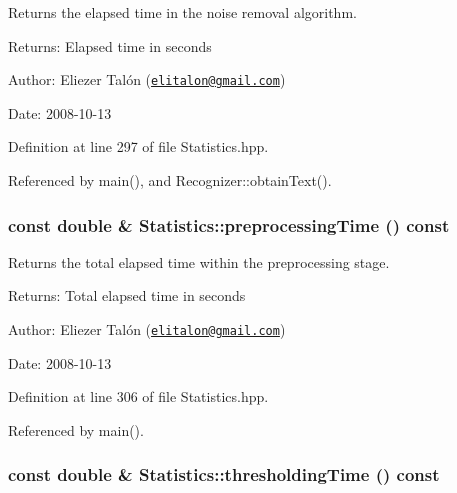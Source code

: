 Returns the elapsed time in the noise removal algorithm. 

\begin{Desc}
\item[Returns:]Elapsed time in seconds\end{Desc}
\begin{Desc}
\item[Author:]Eliezer Talón (\href{mailto:elitalon@gmail.com}{\tt elitalon@gmail.com}) \end{Desc}
\begin{Desc}
\item[Date:]2008-10-13 \end{Desc}


Definition at line 297 of file Statistics.hpp.

Referenced by main(), and Recognizer::obtainText().\hypertarget{class_statistics_9b1c2d1f1338069346c80293a2c11b6d}{
\subsubsection[preprocessingTime]{\setlength{\rightskip}{0pt plus 5cm}const double \& Statistics::preprocessingTime () const}}
\label{class_statistics_9b1c2d1f1338069346c80293a2c11b6d}


Returns the total elapsed time within the preprocessing stage. 

\begin{Desc}
\item[Returns:]Total elapsed time in seconds\end{Desc}
\begin{Desc}
\item[Author:]Eliezer Talón (\href{mailto:elitalon@gmail.com}{\tt elitalon@gmail.com}) \end{Desc}
\begin{Desc}
\item[Date:]2008-10-13 \end{Desc}


Definition at line 306 of file Statistics.hpp.

Referenced by main().\hypertarget{class_statistics_51a8c70011a201873db8f388dad733ac}{
\subsubsection[thresholdingTime]{\setlength{\rightskip}{0pt plus 5cm}const double \& Statistics::thresholdingTime () const}}
\label{class_statistics_51a8c70011a201873db8f388dad733ac}


